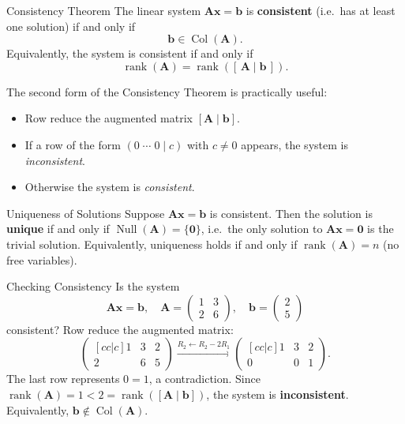 \documentclass[12pt,a4paper]{article}
\newcommand{\vv}[1]{\mathbf{#1}}
\newcommand{\vzero}{\mathbf{0}}
\newcommand{\rank}{\operatorname{rank}}
\newcommand{\Null}{\operatorname{Null}}
\newcommand{\Col}{\operatorname{Col}}
\newcommand{\mat}[1]{\mathbf{#1}}
\begin{document}
	\begin{thmbox}{Consistency Theorem}{}
		The linear system \(\mat{A}\vv{x} = \vv{b}\) is \textbf{consistent}
		(i.e.\ has at least one solution) if and only if
		\[
		\vv{b} \in \Col(\mat{A}).
		\]
		Equivalently, the system is consistent if and only if
		\[
		\rank(\mat{A}) = \rank([\,\mat{A} \mid \vv{b}\,]).
		\]
	\end{thmbox}
	
	\begin{remarkbox}{}{}
		The second form of the Consistency Theorem is practically useful:
		\begin{itemize}[leftmargin=2em, itemsep=2pt]
			\item Row reduce the augmented matrix \([\mat{A} \mid \vv{b}]\).
			\item If a row of the form \((0\;\cdots\;0 \mid c)\) with \(c \neq 0\) appears,
			the system is \emph{inconsistent}.
			\item Otherwise the system is \emph{consistent}.
		\end{itemize}
	\end{remarkbox}
	
	\begin{thmbox}{Uniqueness of Solutions}{}
		Suppose \(\mat{A}\vv{x} = \vv{b}\) is consistent. Then the solution is \textbf{unique}
		if and only if \(\Null(\mat{A}) = \{\vzero\}\), i.e.\ the only solution to
		\(\mat{A}\vv{x} = \vzero\) is the trivial solution.  Equivalently, uniqueness holds
		if and only if \(\rank(\mat{A}) = n\) (no free variables).
	\end{thmbox}
	
	\begin{exbox}{Checking Consistency}{}
		Is the system
		\[
		\mat{A}\vv{x} = \vv{b}, \quad
		\mat{A} =
		\begin{pmatrix}
			1 & 3 \\
			2 & 6
		\end{pmatrix},
		\quad
		\vv{b} = \begin{pmatrix}2\\5\end{pmatrix}
		\]
		consistent?  Row reduce the augmented matrix:
		\[
		\begin{pmatrix}[cc|c]
			1 & 3 & 2\\
			2 & 6 & 5
		\end{pmatrix}
		\xrightarrow{R_2 \leftarrow R_2 - 2R_1}
		\begin{pmatrix}[cc|c]
			1 & 3 & 2\\
			0 & 0 & 1
		\end{pmatrix}.
		\]
		The last row represents \(0 = 1\), a contradiction.
		Since \(\rank(\mat{A}) = 1 < 2 = \rank([\mat{A}\mid\vv{b}])\), the system is
		\textbf{inconsistent}.  Equivalently, \(\vv{b} \notin \Col(\mat{A})\).
	\end{exbox}
	
\end{document}
